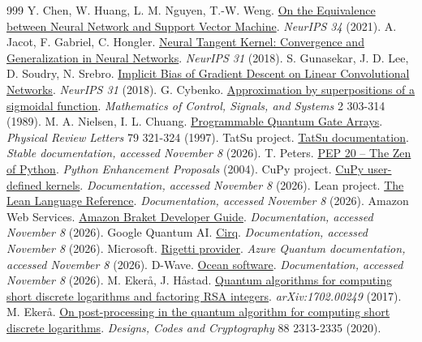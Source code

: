 \begin{thebibliography}{999}
 Y. Chen, W. Huang, L. M. Nguyen, T.-W. Weng. \href{https://proceedings.neurips.cc/paper/2021/hash/c559da2ba967eb820766939a658022c8-Abstract.html}{On the Equivalence between Neural Network and Support Vector Machine}. \emph{NeurIPS 34}  (2021).
 A. Jacot, F. Gabriel, C. Hongler. \href{https://arxiv.org/abs/1806.07572}{Neural Tangent Kernel: Convergence and Generalization in Neural Networks}. \emph{NeurIPS 31}  (2018).
 S. Gunasekar, J. D. Lee, D. Soudry, N. Srebro. \href{https://proceedings.neurips.cc/paper/2018/hash/0e98aeeb54acf612b9eb4e48a269814c-Abstract.html}{Implicit Bias of Gradient Descent on Linear Convolutional Networks}. \emph{NeurIPS 31}  (2018).
 G. Cybenko. \href{https://doi.org/10.1007/BF02551274}{Approximation by superpositions of a sigmoidal function}. \emph{Mathematics of Control, Signals, and Systems} 2 303-314 (1989).
 M. A. Nielsen, I. L. Chuang. \href{https://doi.org/10.1103/PhysRevLett.79.321}{Programmable Quantum Gate Arrays}. \emph{Physical Review Letters} 79 321-324 (1997).
 TatSu project. \href{https://tatsu.readthedocs.io/en/stable/}{TatSu documentation}. \emph{Stable documentation, accessed November 8}  (2026).
 T. Peters. \href{https://peps.python.org/pep-0020/}{PEP 20 -- The Zen of Python}. \emph{Python Enhancement Proposals}  (2004).
 CuPy project. \href{https://docs.cupy.dev/en/stable/user_guide/kernel.html}{CuPy user-defined kernels}. \emph{Documentation, accessed November 8}  (2026).
 Lean project. \href{https://lean-lang.org/doc/reference/latest/}{The Lean Language Reference}. \emph{Documentation, accessed November 8}  (2026).
 Amazon Web Services. \href{https://docs.aws.amazon.com/braket/latest/developerguide/what-is-braket.html}{Amazon Braket Developer Guide}. \emph{Documentation, accessed November 8}  (2026).
 Google Quantum AI. \href{https://quantumai.google/cirq}{Cirq}. \emph{Documentation, accessed November 8}  (2026).
 Microsoft. \href{https://learn.microsoft.com/en-us/azure/quantum/provider-rigetti}{Rigetti provider}. \emph{Azure Quantum documentation, accessed November 8}  (2026).
 D-Wave. \href{https://docs.dwavequantum.com/en/latest/ocean/}{Ocean software}. \emph{Documentation, accessed November 8}  (2026).
 M. Ekerå, J. Håstad. \href{https://arxiv.org/abs/1702.00249}{Quantum algorithms for computing short discrete logarithms and factoring RSA integers}. \emph{arXiv:1702.00249}  (2017).
 M. Ekerå. \href{https://doi.org/10.1007/s10623-020-00783-2}{On post-processing in the quantum algorithm for computing short discrete logarithms}. \emph{Designs, Codes and Cryptography} 88 2313-2335 (2020).

\end{thebibliography}
